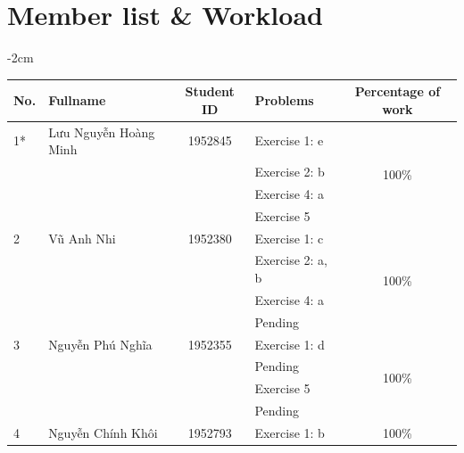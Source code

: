\documentclass[a4paper]{article}
\begin{document}
\section*{Member list \& Workload}
\begin{center}
  \addtolength{\leftskip} {-2cm}
  \addtolength{\rightskip}{-2cm}
  \begin{tabular}{llclc}
    \toprule
    \textbf{No.} & \textbf{Fullname}     & \textbf{Student ID} & \textbf{Problems} & \textbf{Percentage of work} \\
    \midrule
    1*           & Lưu Nguyễn Hoàng Minh & 1952845             & Exercise 1: e     & \multirow{4}{*}{100\%}      \\
                 &                       &                     & Exercise 2: b     &                             \\
                 &                       &                     & Exercise 4: a     &                             \\
                 &                       &                     & Exercise 5        &                             \\
    \midrule
    2            & Vũ Anh Nhi            & 1952380             & Exercise 1: c     & \multirow{4}{*}{100\%}      \\
                 &                       &                     & Exercise 2: a, b  &                             \\
                 &                       &                     & Exercise 4: a     &                             \\
                 &                       &                     & Pending           &                             \\
    \midrule
    3            & Nguyễn Phú Nghĩa      & 1952355             & Exercise 1: d     & \multirow{4}{*}{100\%}      \\
                 &                       &                     & Pending           &                             \\
                 &                       &                     & Exercise 5        &                             \\
                 &                       &                     & Pending           &                             \\
    \midrule
    4            & Nguyễn Chính Khôi     & 1952793             & Exercise 1: b     & \multirow{4}{*}{100\%}      \\

\end{tabular}
\end{center}
\end{document}
